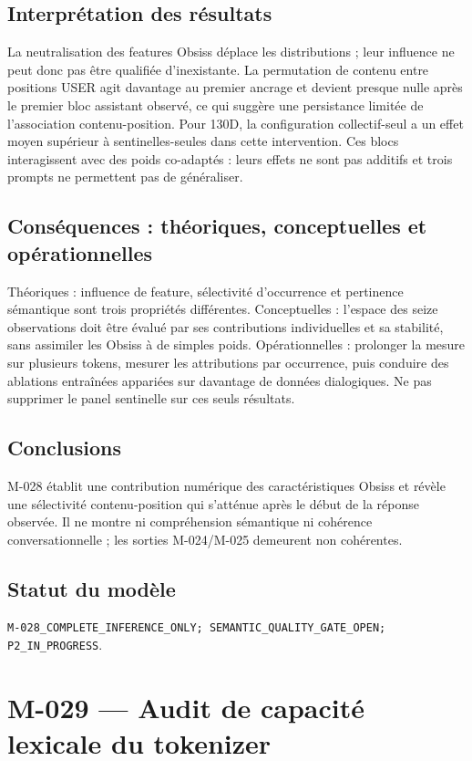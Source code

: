 \documentclass[11pt,a4paper]{report}
\begin{document}
\subsection{Interprétation des résultats}
La neutralisation des features Obsiss déplace les distributions ; leur influence ne peut donc pas être qualifiée d'inexistante. La permutation de contenu entre positions USER agit davantage au premier ancrage et devient presque nulle après le premier bloc assistant observé, ce qui suggère une persistance limitée de l'association contenu-position. Pour 130D, la configuration collectif-seul a un effet moyen supérieur à sentinelles-seules dans cette intervention. Ces blocs interagissent avec des poids co-adaptés : leurs effets ne sont pas additifs et trois prompts ne permettent pas de généraliser.
\subsection{Conséquences : théoriques, conceptuelles et opérationnelles}
Théoriques : influence de feature, sélectivité d'occurrence et pertinence sémantique sont trois propriétés différentes. Conceptuelles : l'espace des seize observations doit être évalué par ses contributions individuelles et sa stabilité, sans assimiler les Obsiss à de simples poids. Opérationnelles : prolonger la mesure sur plusieurs tokens, mesurer les attributions par occurrence, puis conduire des ablations entraînées appariées sur davantage de données dialogiques. Ne pas supprimer le panel sentinelle sur ces seuls résultats.
\subsection{Conclusions}
M-028 établit une contribution numérique des caractéristiques Obsiss et révèle une sélectivité contenu-position qui s'atténue après le début de la réponse observée. Il ne montre ni compréhension sémantique ni cohérence conversationnelle ; les sorties M-024/M-025 demeurent non cohérentes.
\subsection{Statut du modèle}
\texttt{M-028\_COMPLETE\_INFERENCE\_ONLY; SEMANTIC\_QUALITY\_GATE\_OPEN; P2\_IN\_PROGRESS}.

\section{M-029 — Audit de capacité lexicale du tokenizer}
\label{sec:m029-tokenizer-capacity}
\end{document}
